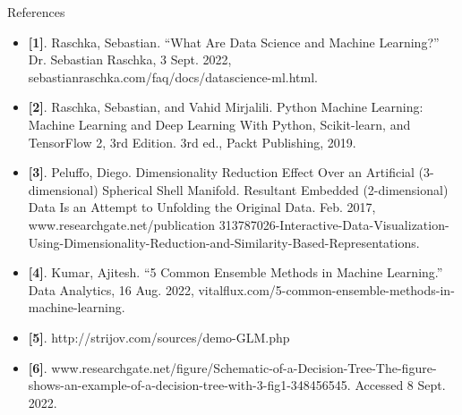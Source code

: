 \documentclass[compress,oilve]{beamer}
\begin{document}



\begin{frame}{References}
\begin{itemize}
\item{} \textbf{[1]}. Raschka, Sebastian. “What Are Data Science and Machine Learning?” Dr. Sebastian Raschka, 3 Sept. 2022, sebastianraschka.com/faq/docs/datascience-ml.html.
\item{} \textbf{[2]}. Raschka, Sebastian, and Vahid Mirjalili. Python Machine Learning: Machine Learning and Deep Learning With Python, Scikit-learn, and TensorFlow 2, 3rd Edition. 3rd ed., Packt Publishing, 2019.
\item{} \textbf{[3]}. Peluffo, Diego. Dimensionality Reduction Effect Over an Artificial (3-dimensional) Spherical Shell Manifold. Resultant Embedded (2-dimensional) Data Is an Attempt to Unfolding the Original Data. Feb. 2017, www.researchgate.net/publication 313787026-Interactive-Data-Visualization-Using-Dimensionality-Reduction-and-Similarity-Based-Representations.
\item{} \textbf{[4]}. Kumar, Ajitesh. “5 Common Ensemble Methods in Machine Learning.” Data Analytics, 16 Aug. 2022, vitalflux.com/5-common-ensemble-methods-in-machine-learning.
\item{} \textbf{[5]}. http://strijov.com/sources/demo-GLM.php
\item{} \textbf{[6]}. www.researchgate.net/figure/Schematic-of-a-Decision-Tree-The-figure-shows-an-example-of-a-decision-tree-with-3-fig1-348456545. Accessed 8 Sept. 2022.
\end{itemize}
\end{frame}
\end{document}
